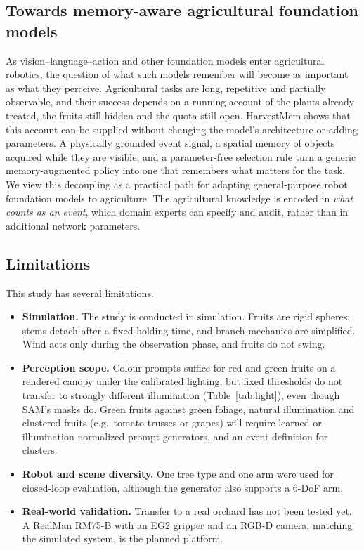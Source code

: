 \subsection{Towards memory-aware agricultural foundation models}
As vision--language--action and other foundation models enter agricultural robotics, the question of what such models remember will become as important as what they perceive. Agricultural tasks are long, repetitive and partially observable, and their success depends on a running account of the plants already treated, the fruits still hidden and the quota still open. HarvestMem shows that this account can be supplied without changing the model's architecture or adding parameters. A physically grounded event signal, a spatial memory of objects acquired while they are visible, and a parameter-free selection rule turn a generic memory-augmented policy into one that remembers what matters for the task. We view this decoupling as a practical path for adapting general-purpose robot foundation models to agriculture. The agricultural knowledge is encoded in \emph{what counts as an event}, which domain experts can specify and audit, rather than in additional network parameters.

\subsection{Limitations}
This study has several limitations.
\begin{itemize}
\item \textbf{Simulation.} The study is conducted in simulation. Fruits are rigid spheres; stems detach after a fixed holding time, and branch mechanics are simplified. Wind acts only during the observation phase, and fruits do not swing.
\item \textbf{Perception scope.} Colour prompts suffice for red and green fruits on a rendered canopy under the calibrated lighting, but fixed thresholds do not transfer to strongly different illumination (Table~\ref{tab:light}), even though SAM's masks do. Green fruits against green foliage, natural illumination and clustered fruits (e.g.\ tomato trusses or grapes) will require learned or illumination-normalized prompt generators, and an event definition for clusters.
\item \textbf{Robot and scene diversity.} One tree type and one arm were used for closed-loop evaluation, although the generator also supports a 6-DoF arm.
\item \textbf{Real-world validation.} Transfer to a real orchard has not been tested yet. A RealMan RM75-B with an EG2 gripper and an RGB-D camera, matching the simulated system, is the planned platform.
\end{itemize}

